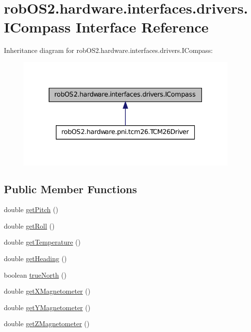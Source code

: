 \hypertarget{interfacerob_o_s2_1_1hardware_1_1interfaces_1_1drivers_1_1_i_compass}{
\section{robOS2.hardware.interfaces.drivers.ICompass Interface Reference}
\label{interfacerob_o_s2_1_1hardware_1_1interfaces_1_1drivers_1_1_i_compass}
}


Inheritance diagram for robOS2.hardware.interfaces.drivers.ICompass:\nopagebreak
\begin{figure}[H]
\begin{center}
\leavevmode
\includegraphics[width=316pt]{interfacerob_o_s2_1_1hardware_1_1interfaces_1_1drivers_1_1_i_compass__inherit__graph}
\end{center}
\end{figure}
\subsection*{Public Member Functions}
\begin{DoxyCompactItemize}
\item 
double \hyperlink{interfacerob_o_s2_1_1hardware_1_1interfaces_1_1drivers_1_1_i_compass_ab45e6c9b7b26ed373614414ae5b6a03b}{getPitch} ()
\item 
double \hyperlink{interfacerob_o_s2_1_1hardware_1_1interfaces_1_1drivers_1_1_i_compass_a8a940ab5db67369fc34241f1cbaa9165}{getRoll} ()
\item 
double \hyperlink{interfacerob_o_s2_1_1hardware_1_1interfaces_1_1drivers_1_1_i_compass_aeab6ef23c677f59ca95d2f3798a5d4ed}{getTemperature} ()
\item 
double \hyperlink{interfacerob_o_s2_1_1hardware_1_1interfaces_1_1drivers_1_1_i_compass_a552e246fb56e5eaf6ed81a1a65052621}{getHeading} ()
\item 
boolean \hyperlink{interfacerob_o_s2_1_1hardware_1_1interfaces_1_1drivers_1_1_i_compass_a1a641c886a92eb7c0fdc2eebb967fb82}{trueNorth} ()
\item 
double \hyperlink{interfacerob_o_s2_1_1hardware_1_1interfaces_1_1drivers_1_1_i_compass_a7846f739443a8721e333cec393a10c2e}{getXMagnetometer} ()
\item 
double \hyperlink{interfacerob_o_s2_1_1hardware_1_1interfaces_1_1drivers_1_1_i_compass_ac8f72071f50b4357017499b183126fce}{getYMagnetometer} ()
\item 
double \hyperlink{interfacerob_o_s2_1_1hardware_1_1interfaces_1_1drivers_1_1_i_compass_a3a710479b3f802bc755f820afe430700}{getZMagnetometer} ()
\end{DoxyCompactItemize}


